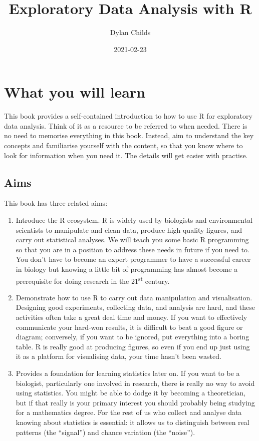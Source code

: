 \documentclass[
]{book}
\title{Exploratory Data Analysis with R}
\author{Dylan Childs}
\date{2021-02-23}
\begin{document}
\maketitle

{
\setcounter{tocdepth}{1}
\tableofcontents
}
\hypertarget{what-you-will-learn}{%
\chapter*{What you will learn}\label{what-you-will-learn}}

This book provides a self-contained introduction to how to use R for exploratory data analysis. Think of it as a resource to be referred to when needed. There is no need to memorise everything in this book. Instead, aim to understand the key concepts and familiarise yourself with the content, so that you know where to look for information when you need it. The details will get easier with practise.

\hypertarget{aims}{%
\section*{Aims}\label{aims}}

This book has three related aims:

\begin{enumerate}
\def\labelenumi{\arabic{enumi}.}
\item
  Introduce the R ecosystem. R is widely used by biologists and environmental scientists to manipulate and clean data, produce high quality figures, and carry out statistical analyses. We will teach you some basic R programming so that you are in a position to address these needs in future if you need to. You don't have to become an expert programmer to have a successful career in biology but knowing a little bit of programming has almost become a prerequisite for doing research in the 21\textsuperscript{st} century.
\item
  Demonstrate how to use R to carry out data manipulation and visualisation. Designing good experiments, collecting data, and analysis are hard, and these activities often take a great deal time and money. If you want to effectively communicate your hard-won results, it is difficult to beat a good figure or diagram; conversely, if you want to be ignored, put everything into a boring table. R is really good at producing figures, so even if you end up just using it as a platform for visualising data, your time hasn't been wasted.
\item
  Provides a foundation for learning statistics later on. If you want to be a biologist, particularly one involved in research, there is really no way to avoid using statistics. You might be able to dodge it by becoming a theoretician, but if that really is your primary interest you should probably being studying for a mathematics degree. For the rest of us who collect and analyse data knowing about statistics is essential: it allows us to distinguish between real patterns (the ``signal'') and chance variation (the ``noise'').
\end{enumerate}
\end{document}
